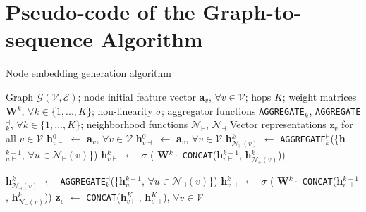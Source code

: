 \documentclass{article} \usepackage{iclr2019_conference,times}
\begin{document}
\section{Pseudo-code of the Graph-to-sequence Algorithm}
\begin{algorithm}[h]
\small
 \caption{\small Node embedding generation algorithm}
 \label{alg:node_embedding}
 \begin{algorithmic}[1]
 Graph $\mathcal{G}(\mathcal{V}, \mathcal{E})$; node initial feature vector {\textbf{a}$_{v}$, $\forall v \in \mathcal{V}$};
        hops $K$; weight matrices \textbf{W}$^{k}$, $\forall k \in \{1,...,K\}$; non-linearity $\sigma$;
        aggregator functions \texttt{\small AGGREGATE}$_{k}^{\vdash}$, \texttt{\small AGGREGATE}$_{k}^{\dashv}$, $\forall k \in \{1,...,K\}$;
        neighborhood functions $\mathcal{N}_{\vdash}$, $\mathcal{N}_{\dashv}$ 
 Vector representations z$_{v}$ for all $v \in \mathcal{V}$ 
\STATE \textbf{h}$_{v\vdash}^{0}$ $\leftarrow$ \textbf{a}$_{v}$, $\forall v \in \mathcal{V}$
\STATE \textbf{h}$_{v\dashv}^{0}$ $\leftarrow$ \textbf{a}$_{v}$, $\forall v \in \mathcal{V}$
    \STATE \textbf{h}$_{\mathcal{N}_{\vdash}(v)}^{k}$ $\leftarrow$ \texttt{AGGREGATE}$_{k}^{\vdash}$(\{\textbf{h}$_{u\vdash}^{k-1}$, $\forall u \in \mathcal{N}_{\vdash}(v)$\})
    \STATE \textbf{h}$_{v\vdash}^{k}$ $\leftarrow$ $\sigma$ ( \textbf{W}$^{k}\cdot$ \texttt{CONCAT}(\textbf{h}$_{v\vdash}^{k-1}$, \textbf{h}$_{\mathcal{N}_{\vdash}(v)}^{k}$))
    
    \STATE \textbf{h}$_{\mathcal{N}_{\dashv}(v)}^{k}$ $\leftarrow$ \texttt{AGGREGATE}$_{k}^{\dashv}$(\{\textbf{h}$_{u\dashv}^{k-1}$, $\forall u \in \mathcal{N}_{\dashv}(v)$\})
    \STATE \textbf{h}$_{v\dashv}^{k}$ $\leftarrow$ $\sigma$ ( \textbf{W}$^{k}\cdot$ \texttt{CONCAT}(\textbf{h}$_{v\dashv}^{k-1}$, \textbf{h}$_{\mathcal{N}_{\dashv}(v)}^{k}$))
    \ENDFOR
\ENDFOR
\STATE \textbf{z}$_{v}$ $\leftarrow$ \texttt{CONCAT}(\textbf{h}$_{v\vdash}^{K}$, \textbf{h}$_{v\dashv}^{K}$), $\forall v \in \mathcal{V}$
\end{algorithmic}
\end{algorithm}
\end{document}
